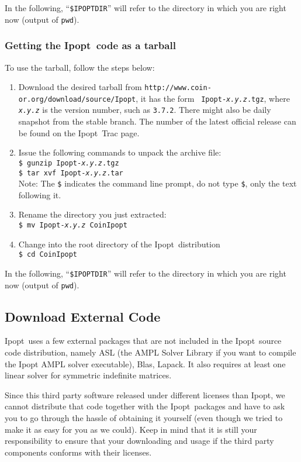 \documentclass[10pt]{article}
\newcommand{\Ipopt}{{\sc Ipopt}}
\begin{document}
In the following, ``\texttt{\$IPOPTDIR}'' will refer to the directory in
which you are right now (output of \texttt{pwd}).

\subsubsection{Getting the \Ipopt\ code as a tarball}

To use the tarball, follow the steps below:
\begin{enumerate}
\item Download the desired tarball from
  \texttt{http://www.coin-or.org/download/source/Ipopt}, it has the form {\tt
    Ipopt-{\em x.y.z}.tgz}, where {\tt\em x.y.z} is the version
  number, such as {\tt 3.7.2}.  There might also be daily snapshot
  from the stable branch.  The number of the latest official release
  can be found on the \Ipopt\ Trac page.
\item Issue the following commands to unpack the archive file: \\
\texttt{\$ gunzip Ipopt-{\em x.y.z}.tgz} \\
\texttt{\$ tar xvf Ipopt-{\em x.y.z}.tar} \\
Note: The {\tt \$} indicates the command line
prompt, do not type {\tt \$}, only the text following it.
\item Rename the directory you just extracted:\\
\texttt{\$ mv Ipopt-{\em x.y.z} CoinIpopt}
\item Change into the root directory of the \Ipopt\ distribution\\
{\tt \$ cd CoinIpopt}
\end{enumerate}

In the following, ``\texttt{\$IPOPTDIR}'' will refer to the directory in
which you are right now (output of \texttt{pwd}).

\subsection{Download External Code}\label{ExternalCode}
\Ipopt\ uses a few external packages that are not included in the
\Ipopt\ source code distribution, namely ASL (the AMPL Solver Library
if you want to compile the Ipopt AMPL solver executable), Blas,
Lapack.  It also requires at least one linear solver for symmetric
indefinite matrices.

Since this third party software released under different licenses than
\Ipopt, we cannot distribute that code together with the \Ipopt\
packages and have to ask you to go through the hassle of obtaining it
yourself (even though we tried to make it as easy for you as we
could).  Keep in mind that it is still your responsibility to ensure
that your downloading and usage if the third party components conforms
with their licenses.
\end{document}
